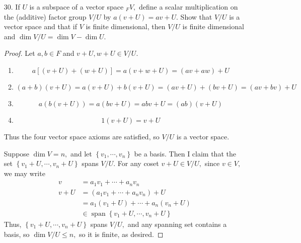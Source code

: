 \documentclass{article}
\DeclareMathOperator{\spn}{span}
\begin{document}
\begin{itemize}
\begin{enumerate}[(a)]
			\item Show that a spanning set $\left\{ v_1, \cdots, v_n \right\}$ of $_F V$ with $n$ minimal is a basis.
				\begin{proof}
					Let $v\in V,$ so since $\left\{ v_1, \cdots, v_n \right\}$ is spanning, we may write
					\[v = a_1v_1 + \cdots + a_nv_n\]
					for $a_i\in F, \forall i.$ If $n$ is minimal, then it must be that removing any of the $v_i$ from the set will cause it to not span $V.$ WLOG, remove $a_1.$ 
				\end{proof}<++>
				
		\end{enumerate}

	\item[30.] If $U$ is a subspace of a vector space $_F V,$ define a scalar multiplication on the (additive) factor group $V/U$ by $a(v+U)=av+U.$ Show that $V/U$ is a vector space and that if $V$ is finite dimensional, then $V/U$ is finite dimensional and $\dim V/U=\dim V-\dim U.$
		\begin{proof} Let $a, b\in F$ and $v+U, w+U\in V/U.$
			\begin{enumerate}[V1]
				\item
					\[a\left[ (v+U)+(w+U) \right] = a(v+w+U) = (av+aw) + U\]
					
				\item 
					\[(a+b)(v+U) = a(v+U) + b(v+U) = (av+U)+(bv+U) = (av+bv) + U\]

				\item 
					\[a(b(v+U)) = a(bv + U) = abv + U = (ab)(v+U)\]

				\item
					\[1(v+U) = v+U\]
					
			\end{enumerate}
			Thus the four vector space axioms are satisfied, so $V/U$ is a vector space.

			Suppose $\dim V=n,$ and let $\left\{ v_1, \cdots, v_n \right\}$ be a basis. Then I claim that the set $\left\{ v_1+U, \cdots, v_n+U \right\}$ spans $V/U.$ For any coset $v+U\in V/U,$ since $v\in V,$ we may write
			\begin{align*}
				v &= a_1v_1+\cdots+a_nv_n \\
				v+U &= (a_1v_1+\cdots+a_nv_n) + U \\
				&= a_1(v_1+U) + \cdots + a_n(v_n+U) \\
				&\in \spn\left\{ v_1+U, \cdots, v_n+U \right\}
			\end{align*}
			Thus, $\left\{ v_1+U, \cdots, v_n+U \right\}$ spans $V/U,$ and any spanning set contains a basis, so $\dim V/U\le n,$ so it is finite, as desired.
		\end{proof}


\end{itemize}
\end{document}
